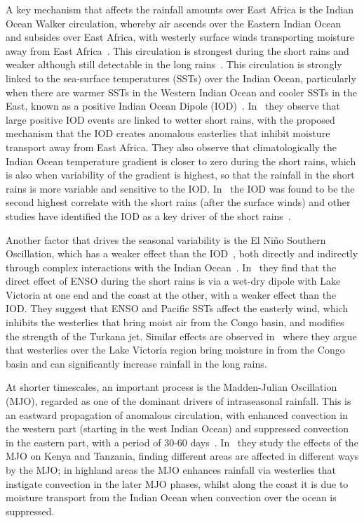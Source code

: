 \documentclass[../main.tex]{subfiles}
\begin{document}
A key mechanism that affects the rainfall amounts over East Africa is the Indian Ocean Walker circulation, whereby air ascends over the Eastern Indian Ocean and subsides over East Africa, with westerly surface winds transporting moisture away from East Africa~\citep{nicholson_climate_2017, palmer_drivers_2023}. This circulation is strongest during the short rains and weaker although still detectable in the long rains~\citep{pohl_intraseasonal_2011}. This circulation is strongly linked to the sea-surface temperatures (SSTs) over the Indian Ocean, particularly when there are warmer SSTs in the Western Indian Ocean and cooler SSTs in the East, known as a positive Indian Ocean Dipole (IOD)~\citep{nicholson_climate_2017, wainwright_extreme_2021}. 
In~\cite{black_observational_2003} they observe that large positive IOD events are linked to wetter short rains, with the proposed mechanism that the IOD creates anomalous easterlies that inhibit moisture transport away from East Africa. They also observe that climatologically the Indian Ocean temperature gradient is closer to zero during the short rains, which is also when variability of the gradient is highest, so that the rainfall in the short rains is more variable and sensitive to the IOD. In~\cite{nicholson_long-term_2015} the IOD was found to be the second highest correlate with the short rains (after the surface winds) and other studies have identified the IOD as a key driver of the short rains~\citep{wainwright_extreme_2021, macleod_causal_2021}.

Another factor that drives the seasonal variability is the El Ni\~{n}o Southern Oscillation, which has a weaker effect than the IOD~\citep{nicholson_long-term_2015}, both directly and indirectly through complex interactions with the Indian Ocean~\citep{black_observational_2003}. In~\cite{macleod_causal_2021} they find that the direct effect of ENSO during the short rains is via a wet-dry dipole with Lake Victoria at one end and the coast at the other, with a weaker effect than the IOD. They suggest that ENSO and Pacific SSTs affect the easterly wind, which inhibits the westerlies that bring moist air from the Congo basin, and modifies the strength of the Turkana jet. Similar effects are observed in~\citep{finney_effect_2020} where they argue that westerlies over the Lake Victoria region bring moisture in from the Congo basin and can significantly increase rainfall in the long rains. 

At shorter timescales, an important process is the Madden-Julian Oscillation (MJO), regarded as one of the dominant drivers of intraseasonal rainfall. This is an eastward propagation of anomalous circulation, with enhanced convection in the western part (starting in the west Indian Ocean) and suppressed convection in the eastern part, with a period of 30-60 days~\citep{nicholson_climate_2017}. In~\cite{pohl_influence_2006} they study the effects of the MJO on Kenya and Tanzania, finding different areas are affected in different ways by the MJO; in highland areas the MJO enhances rainfall via westerlies that instigate convection in the later MJO phases, whilst along the coast it is due to moisture transport from the Indian Ocean when convection over the ocean is suppressed. 
\end{document}
